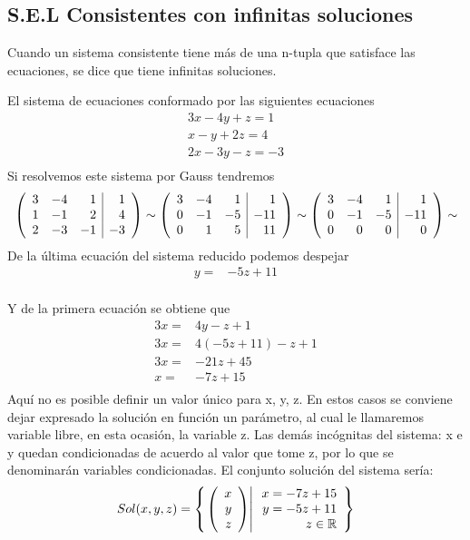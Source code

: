 \subsection{S.E.L Consistentes con infinitas soluciones}
Cuando un sistema consistente tiene más de una n-tupla que satisface las ecuaciones, se dice que tiene infinitas soluciones.

\begin{ejemplo}
El sistema de ecuaciones conformado por las siguientes ecuaciones 
\begin{align*}
3x-4y+z=1\\
x-y+2z=4\\
2x-3y-z=-3\\
\end{align*}
Si resolvemos este sistema por Gauss tendremos
\begin{align*}
\reducir{rrr|r}{
3&-4&1&1\\
1&-1&2&4\\
2&-3&-1&-3\\
}\sim
\reducir{rrr|r}{
3&-4&1&1\\
0&-1&-5&-11\\
0&1&5&11\\
}\sim
\reducir{rrr|r}{
3&-4&1&1\\
0&-1&-5&-11\\
0&0&0&0\\
}\sim
\end{align*}
De la última ecuación del sistema reducido podemos despejar 
\begin{align*}
y=&-5z+11\\
\end{align*}

Y de la primera ecuación se obtiene que
\begin{align*}
3x=&4y-z+1\\
3x=&4(-5z+11)-z+1\\
3x=&-21z+45\\
x=&-7z+15\\
\end{align*}
Aquí no es posible definir un valor único para x, y, z. En estos casos se conviene dejar expresado la solución en función un parámetro, al cual le llamaremos variable libre, en esta ocasión, la variable z. Las demás incógnitas del sistema: x e y quedan condicionadas de acuerdo al valor que tome z, por lo que se denominarán variables condicionadas. El conjunto solución del sistema sería:
\begin{align*}
Sol(x,y, z)=\llaves{\vectrtres{x}{y}{z}}{\begin{array}{r}x=-7z+15\\y=-5z+11\\z\in \dobler
\end{array}}
\end{align*}

\end{ejemplo}

